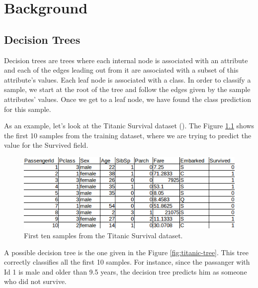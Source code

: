 \newpage

\chapter{Background}
\label{chap:background}

\section{Decision Trees}

Decision trees are trees where each internal node is associated with an attribute and each of the edges leading out from it are associated with a subset of this attribute's values. Each leaf node is associated with a class. In order to classify a sample, we start at the root of the tree and follow the edges given by the sample attributes' values. Once we get to a leaf node, we have found the class prediction for this sample.

As an example, let's look at the Titanic Survival dataset (\cite{Titanic}). The Figure \ref{fig:titanic-dataset} shows the first 10 samples from the training dataset, where we are trying to predict the value for the Survived field.

\begin{figure}[h]
\includegraphics[width=\textwidth]{titanic}
\caption{First ten samples from the Titanic Survival dataset.}
\label{fig:titanic-dataset}
\end{figure}

A possible decision tree is the one given in the Figure \ref{fig:titanic-tree}. This tree correctly classifies all the first 10 samples. For instance, since the passanger with Id 1 is male and older than 9.5 years, the decision tree predicts him as someone who did not survive.

